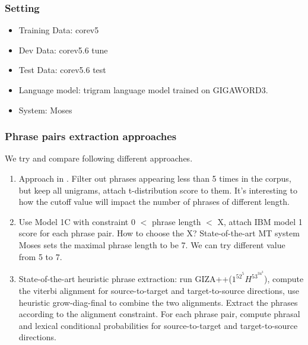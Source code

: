 \documentclass[11pt, letterpaper]{article}   	%
\begin{document}
\subsubsection{Setting}
\begin{itemize}
\item Training Data: corev5
\item Dev Data: corev5.6 tune
\item Test Data: corev5.6 test
\item Language model: trigram language model trained on GIGAWORD3.
\item System: Moses \cite{moses-07}
\end{itemize}

\subsubsection{Phrase pairs extraction approaches}
We try and compare following different approaches.

\begin{enumerate}
\item Approach in \cite{marcu-wong-02}. Filter out phrases appearing less than 5 times in the corpus, but keep all unigrams, attach t-distribution score to them. It's interesting to how the cutoff value will impact the number of phrases of different length.

\item Use Model 1C with constraint 0 $<$ phrase length $<$ X, attach IBM model 1 score for each phrase pair. How to choose the X? State-of-the-art MT system Moses\cite{moses-07} sets the maximal phrase length to be 7. We can try different value from 5 to 7.

\item State-of-the-art heuristic phrase extraction: run GIZA++($1^52^5H^53^34^3$), compute the viterbi alignment for source-to-target and target-to-source directions, use heuristic grow-diag-final to combine the two alignments. Extract the phrases according to the alignment constraint. For each phrase pair, compute phrasal and lexical conditional probabilities for source-to-target and target-to-source directions.
\end{enumerate}
\end{document}
